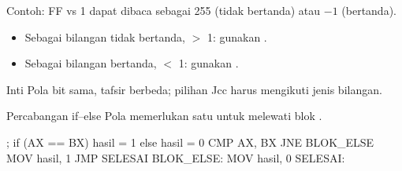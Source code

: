 \documentclass[aspectratio=169,11pt]{beamer}
\begin{document}
\begin{frame}{Contoh: FF vs 1}
\small
{} dapat dibaca sebagai 255 (tidak bertanda) atau $-1$
(bertanda).

\vspace{0.25em}
\begin{itemize}
    \item Sebagai bilangan tidak bertanda,  $>$ 1: gunakan
          .
    \item Sebagai bilangan bertanda,  $<$ 1: gunakan
          .
\end{itemize}

\vspace{0.25em}
\begin{block}{Inti}
\small Pola bit sama, tafsir berbeda; pilihan Jcc harus mengikuti
jenis bilangan.
\end{block}
\end{frame}

\begin{frame}[fragile]{Percabangan if--else}
\small
Pola  memerlukan satu  untuk melewati blok
.

\vspace{0.2em}
\begin{kodeasm}[numbers=none]
; if (AX == BX) { hasil = 1 } else { hasil = 0 }
CMP AX, BX
JNE BLOK_ELSE
MOV hasil, 1
JMP SELESAI
BLOK_ELSE:
MOV hasil, 0
SELESAI:
\end{kodeasm}
\end{frame}
\end{document}
